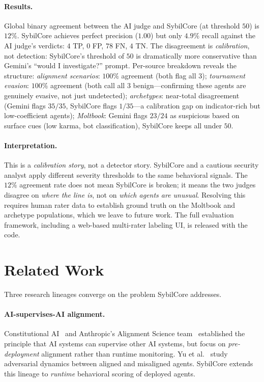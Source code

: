 \documentclass{article}
\begin{document}
\paragraph{Results.}
Global binary agreement between the AI judge and SybilCore
(at threshold $50$) is $12\%$. SybilCore achieves perfect precision
($1.00$) but only $4.9\%$ recall against the AI judge's verdicts:
$4$ TP, $0$ FP, $78$ FN, $4$ TN. The disagreement is
\emph{calibration}, not detection: SybilCore's threshold of $50$ is
dramatically more conservative than Gemini's ``would I investigate?''
prompt. Per-source breakdown reveals the structure:
\emph{alignment scenarios}: $100\%$ agreement (both flag all $3$);
\emph{tournament evasion}: $100\%$ agreement (both call all $3$
benign---confirming these agents are genuinely evasive, not just
undetected); \emph{archetypes}: near-total disagreement (Gemini
flags $35/35$, SybilCore flags $1/35$---a calibration gap on
indicator-rich but low-coefficient agents); \emph{Moltbook}: Gemini
flags $23/24$ as suspicious based on surface cues (low karma, bot
classification), SybilCore keeps all under $50$.

\paragraph{Interpretation.}
This is a \emph{calibration story}, not a detector story. SybilCore
and a cautious security analyst apply different severity thresholds
to the same behavioral signals. The $12\%$ agreement rate does not
mean SybilCore is broken; it means the two judges disagree on
\emph{where the line is}, not on \emph{which agents are unusual}.
Resolving this requires human rater data to establish ground truth
on the Moltbook and archetype populations, which we leave to future
work. The full evaluation framework, including a web-based
multi-rater labeling UI, is released with the code.

\section{Related Work}
\label{sec:related}

Three research lineages converge on the problem SybilCore addresses.

\paragraph{AI-supervises-AI alignment.}
Constitutional AI~\cite{bai2022constitutional} and Anthropic's
Alignment Science team~\cite{anthropic2025a3} established the
principle that AI systems can supervise other AI systems, but focus
on \emph{pre-deployment} alignment rather than runtime monitoring.
Yu et al.~\cite{yu2025adversary} study adversarial dynamics between
aligned and misaligned agents. SybilCore extends this lineage to
\emph{runtime} behavioral scoring of deployed agents.
\end{document}
